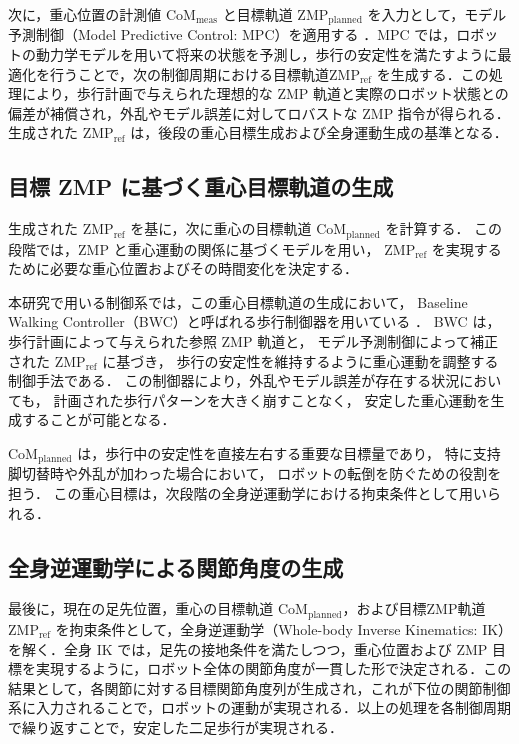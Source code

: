 次に，重心位置の計測値 $\mathrm{CoM}_{\mathrm{meas}}$ と目標軌道 $\mathrm{ZMP}_{\mathrm{planned}}$ を入力として，モデル予測制御（Model Predictive Control: MPC）を適用する \cite{Katayama2023MPC}．MPC では，ロボットの動力学モデルを用いて将来の状態を予測し，歩行の安定性を満たすように最適化を行うことで，次の制御周期における目標軌道$\mathrm{ZMP}_{\mathrm{ref}}$ を生成する．この処理により，歩行計画で与えられた理想的な ZMP 軌道と実際のロボット状態との偏差が補償され，外乱やモデル誤差に対してロバストな ZMP 指令が得られる．生成された $\mathrm{ZMP}_{\mathrm{ref}}$ は，後段の重心目標生成および全身運動生成の基準となる．

\subsection{目標 ZMP に基づく重心目標軌道の生成}
\label{subsec:com_planned_generation}

生成された $\mathrm{ZMP}_{\mathrm{ref}}$ を基に，次に重心の目標軌道 $\mathrm{CoM}_{\mathrm{planned}}$ を計算する．
この段階では，ZMP と重心運動の関係に基づくモデルを用い，
$\mathrm{ZMP}_{\mathrm{ref}}$ を実現するために必要な重心位置およびその時間変化を決定する．

本研究で用いる制御系では，この重心目標軌道の生成において，
Baseline Walking Controller（BWC）と呼ばれる歩行制御器を用いている
\cite{BaselineWalkingControllerGitHub}．
BWC は，歩行計画によって与えられた参照 ZMP 軌道と，
モデル予測制御によって補正された $\mathrm{ZMP}_{\mathrm{ref}}$ に基づき，
歩行の安定性を維持するように重心運動を調整する制御手法である．
この制御器により，外乱やモデル誤差が存在する状況においても，
計画された歩行パターンを大きく崩すことなく，
安定した重心運動を生成することが可能となる．

$\mathrm{CoM}_{\mathrm{planned}}$ は，歩行中の安定性を直接左右する重要な目標量であり，
特に支持脚切替時や外乱が加わった場合において，
ロボットの転倒を防ぐための役割を担う．
この重心目標は，次段階の全身逆運動学における拘束条件として用いられる．

\subsection{全身逆運動学による関節角度の生成}
\label{subsec:whole_body_ik}

最後に，現在の足先位置，重心の目標軌道 $\mathrm{CoM}_{\mathrm{planned}}$，および目標ZMP軌道 $\mathrm{ZMP}_{\mathrm{ref}}$ を拘束条件として，全身逆運動学（Whole-body Inverse Kinematics: IK）を解く．全身 IK では，足先の接地条件を満たしつつ，重心位置および ZMP 目標を実現するように，ロボット全体の関節角度が一貫した形で決定される．この結果として，各関節に対する目標関節角度列が生成され，これが下位の関節制御系に入力されることで，ロボットの運動が実現される．以上の処理を各制御周期で繰り返すことで，安定した二足歩行が実現される．
